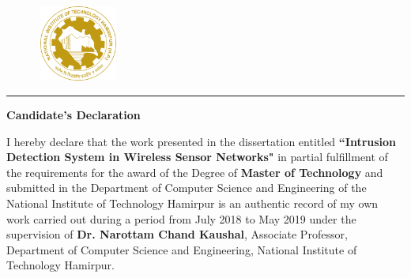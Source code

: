 \graphicspath{{Figures/PNG/}{Figures/}}
\vspace{-4.5\baselineskip}
\begin{figure}[htbp]
	\includegraphics[height=2.5cm,width=2.7cm]{NIT-Logo.png}
\end{figure}
\vspace{-5.0\baselineskip}
\begin{center} 
\end{center}
\noindent\rule{\linewidth}{2pt}
\begin{center}
{\bf\Large \hspace{1cm} Candidate's Declaration }\\
\par\vspace{5mm}
\end{center}
\noindent I hereby declare that the work presented in the dissertation entitled \textbf{``Intrusion Detection System in Wireless Sensor Networks"} in partial fulfillment of the requirements for the award of the Degree of \textbf{Master of Technology} and submitted in the Department of Computer Science and Engineering of the National Institute of Technology Hamirpur is an authentic record of my own work carried out during a period from July 2018 to May 2019 under the supervision of  \textbf{Dr. Narottam Chand Kaushal}, Associate Professor, Department of Computer Science and Engineering, National Institute of Technology Hamirpur.
